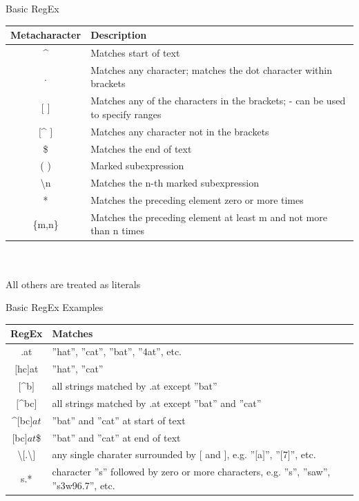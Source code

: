 \documentclass[ignorenonframetext,xcolor=x11names]{beamer}
\begin{document}
\begin{frame}{Basic RegEx}
\footnotesize
\renewcommand{\arraystretch}{1.5}
\begin{tabularx}{\textwidth}{c|X} \hline
{\bf Metacharacter} & {\bf Description} \\ \hline \hline
\^{ } & Matches start of text \\ \hline
. & Matches any character; matches the dot character within brackets \\ \hline
$[$ $]$ & Matches any of the characters in the brackets; - can be used to specify ranges \\ \hline
$[$\^{ } $]$ & Matches any character not in the brackets \\ \hline
\$ & Matches the end of text \\ \hline
( ) & Marked subexpression \\ \hline
\textbackslash n & Matches the n-th marked subexpression \\ \hline
* & Matches the preceding element zero or more times \\ \hline
\{m,n\} & Matches the preceding element at least m and not more than n times \\ \hline
\end{tabularx} \\ \\

All others are treated as literals
\end{frame}

\begin{frame}{Basic RegEx Examples}
\footnotesize
\renewcommand{\arraystretch}{1.5}

\begin{tabularx}{\textwidth}{c|X} \hline
{\bf RegEx} & {\bf Matches} \\ \hline \hline
.at & ''hat'', ''cat'', ''bat'', ''4at'', etc. \\ \hline
$[$hc$]$at & ''hat'', ''cat'' \\ \hline
$[$\^{ }b$]$ & all strings matched by .at except ''bat'' \\ \hline
$[$\^{ }bc$]$ & all strings matched by .at except ''bat'' and ''cat'' \\ \hline
\^{ }$[$bc$]at$ & ''bat'' and ''cat'' at start of text \\ \hline
$[$bc$]at$\$ & ''bat'' and ''cat'' at end of text \\ \hline
\textbackslash $[$.\textbackslash$]$ & any single charater surrounded by $[$ and $]$, e.g. ''$[$a$]$'', ''$[$7$]$'', etc. \\ \hline
s.* & character ''s'' followed by zero or more characters, e.g. ''s'', ''saw'', ''s3w96.7'', etc. \\ \hline
\end{tabularx}
\end{frame}
\end{document}
